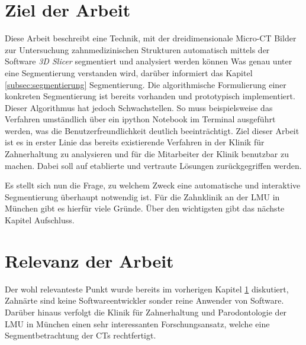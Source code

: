 \section{Ziel der Arbeit}
\label{sec:ziel_der_arbeit} Diese Arbeit beschreibt eine Technik, mit der dreidimensionale
Micro-CT Bilder zur Untersuchung zahnmedizinischen Strukturen automatisch mittels
der Software \textit{3D Slicer} segmentiert und analysiert werden können Was
genau unter eine Segmentierung verstanden wird, darüber informiert das Kapitel \ref{subsec:segmentierung}
Segmentierung. Die algorithmische Formulierung einer konkreten Segmentierung ist
bereits vorhanden und prototypisch implementiert. Dieser Algorithmus hat jedoch Schwachstellen.
So muss beispielsweise das Verfahren umständlich über ein ipython Notebook im
Terminal ausgeführt werden, was die Benutzerfreundlichkeit deutlich beeinträchtigt.
Ziel dieser Arbeit ist es in erster Linie das bereits existierende Verfahren in
der Klinik für Zahnerhaltung zu analysieren und für die Mitarbeiter der Klinik
benutzbar zu machen. Dabei soll auf etablierte und vertraute Lösungen zurückgegriffen
werden.

Es stellt sich nun die Frage, zu welchem Zweck eine automatische und interaktive
Segmentierung überhaupt notwendig ist. Für die Zahnklinik an der LMU in München gibt
es hierfür viele Gründe. Über den wichtigsten gibt das nächste Kapitel
Aufschluss.

\section{Relevanz der Arbeit}
\label{sec:relevanz_der_arbeit} Der wohl relevanteste Punkt wurde bereits im
vorherigen Kapitel \ref{sec:ziel_der_arbeit} diskutiert, Zahnärte sind keine Softwareentwickler
sonder reine Anwender von Software. Darüber hinaus verfolgt die Klinik für
Zahnerhaltung und Parodontologie der LMU in München einen sehr interessanten
Forschungsansatz, welche eine Segmentbetrachtung der CTs rechtfertigt.

